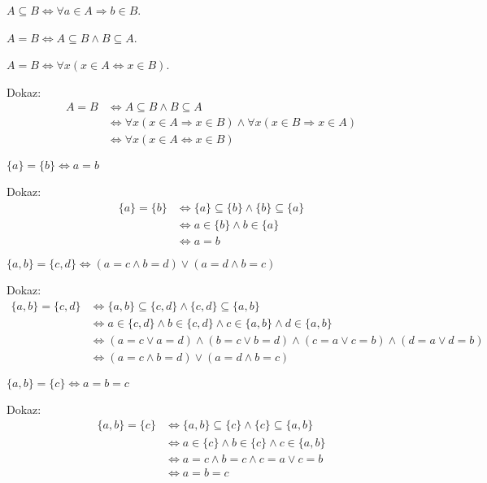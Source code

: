 \begin{definicija}
    $A \subseteq B \iff \forall a \in A \Longrightarrow b \in B$.
\end{definicija}

\begin{definicija}
    $A = B \iff A \subseteq B \wedge B \subseteq A$.
\end{definicija}

\begin{trditev}
    $A = B \iff \forall x (x \in A \iff x \in B)$.
\end{trditev}
Dokaz:
\begin{align*}
    A = B &\iff A \subseteq B \wedge B \subseteq A \\
    &\iff \forall x (x \in A \Longrightarrow x \in B) \wedge \forall x (x \in B \Longrightarrow x \in A) \\
    &\iff \forall x (x \in A \iff x \in B)
\end{align*}

\begin{trditev}
    $\{a\} = \{b\} \iff a = b$
\end{trditev}
Dokaz:
\begin{align*}
    \{a\} = \{b\} &\iff \{a\} \subseteq \{b\} \wedge \{b\} \subseteq \{a\} \\
    &\iff a \in \{b\} \wedge b \in \{a\} \\
    &\iff a = b
\end{align*}

\begin{trditev}
    $\{a, b\} = \{c, d\} \iff (a = c \wedge b = d) \vee (a = d \wedge b = c)$
\end{trditev}
Dokaz:
\begin{align*}
    \{a, b\} = \{c, d\} &\iff \{a, b\} \subseteq \{c, d\} \wedge \{c, d\} \subseteq \{a, b\} \\
    &\iff a \in \{c, d\} \wedge b \in \{c, d\} \wedge c \in \{a, b\} \wedge d \in \{a, b\} \\
    &\iff (a = c \vee a = d) \wedge (b = c \vee b = d) \wedge (c = a \vee c = b) \wedge (d = a \vee d = b) \\
    &\iff (a = c \wedge b = d) \vee (a = d \wedge b = c)
\end{align*}

\begin{trditev}
    $\{a, b\} = \{c\} \iff a = b = c$
\end{trditev}
Dokaz:
\begin{align*}
    \{a, b\} = \{c\} &\iff \{a, b\} \subseteq \{c\} \wedge \{c\} \subseteq \{a, b\} \\
    &\iff a \in \{c\} \wedge b \in \{c\} \wedge c \in \{a, b\} \\
    &\iff a = c \wedge b = c \wedge c = a \vee c = b \\
    &\iff a = b = c
\end{align*}

